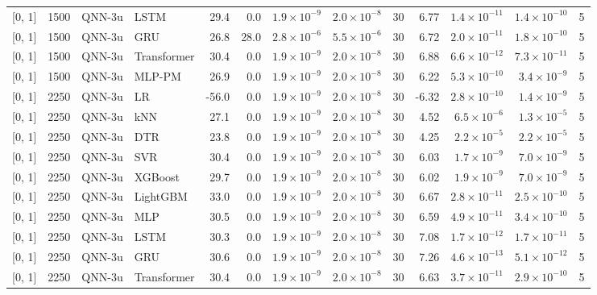 \begin{longtable}{lrllrrrrrrrrr}
{[0, 1]} & 1500 & QNN-3u & LSTM & 29.4 & 0.0 & $1.9 \times 10^{-9}$ & $2.0 \times 10^{-8}$ & 30 & 6.77 & $1.4 \times 10^{-11}$ & $1.4 \times 10^{-10}$ & 5 \\
{[0, 1]} & 1500 & QNN-3u & GRU & 26.8 & 28.0 & $2.8 \times 10^{-6}$ & $5.5 \times 10^{-6}$ & 30 & 6.72 & $2.0 \times 10^{-11}$ & $1.8 \times 10^{-10}$ & 5 \\
{[0, 1]} & 1500 & QNN-3u & Transformer & 30.4 & 0.0 & $1.9 \times 10^{-9}$ & $2.0 \times 10^{-8}$ & 30 & 6.88 & $6.6 \times 10^{-12}$ & $7.3 \times 10^{-11}$ & 5 \\
{[0, 1]} & 1500 & QNN-3u & MLP-PM & 26.9 & 0.0 & $1.9 \times 10^{-9}$ & $2.0 \times 10^{-8}$ & 30 & 6.22 & $5.3 \times 10^{-10}$ & $3.4 \times 10^{-9}$ & 5 \\
\midrule
{[0, 1]} & 2250 & QNN-3u & LR & -56.0 & 0.0 & $1.9 \times 10^{-9}$ & $2.0 \times 10^{-8}$ & 30 & -6.32 & $2.8 \times 10^{-10}$ & $1.4 \times 10^{-9}$ & 5 \\
{[0, 1]} & 2250 & QNN-3u & kNN & 27.1 & 0.0 & $1.9 \times 10^{-9}$ & $2.0 \times 10^{-8}$ & 30 & 4.52 & $6.5 \times 10^{-6}$ & $1.3 \times 10^{-5}$ & 5 \\
{[0, 1]} & 2250 & QNN-3u & DTR & 23.8 & 0.0 & $1.9 \times 10^{-9}$ & $2.0 \times 10^{-8}$ & 30 & 4.25 & $2.2 \times 10^{-5}$ & $2.2 \times 10^{-5}$ & 5 \\
{[0, 1]} & 2250 & QNN-3u & SVR & 30.4 & 0.0 & $1.9 \times 10^{-9}$ & $2.0 \times 10^{-8}$ & 30 & 6.03 & $1.7 \times 10^{-9}$ & $7.0 \times 10^{-9}$ & 5 \\
{[0, 1]} & 2250 & QNN-3u & XGBoost & 29.7 & 0.0 & $1.9 \times 10^{-9}$ & $2.0 \times 10^{-8}$ & 30 & 6.02 & $1.9 \times 10^{-9}$ & $7.0 \times 10^{-9}$ & 5 \\
{[0, 1]} & 2250 & QNN-3u & LightGBM & 33.0 & 0.0 & $1.9 \times 10^{-9}$ & $2.0 \times 10^{-8}$ & 30 & 6.67 & $2.8 \times 10^{-11}$ & $2.5 \times 10^{-10}$ & 5 \\
{[0, 1]} & 2250 & QNN-3u & MLP & 30.5 & 0.0 & $1.9 \times 10^{-9}$ & $2.0 \times 10^{-8}$ & 30 & 6.59 & $4.9 \times 10^{-11}$ & $3.4 \times 10^{-10}$ & 5 \\
{[0, 1]} & 2250 & QNN-3u & LSTM & 30.3 & 0.0 & $1.9 \times 10^{-9}$ & $2.0 \times 10^{-8}$ & 30 & 7.08 & $1.7 \times 10^{-12}$ & $1.7 \times 10^{-11}$ & 5 \\
{[0, 1]} & 2250 & QNN-3u & GRU & 30.6 & 0.0 & $1.9 \times 10^{-9}$ & $2.0 \times 10^{-8}$ & 30 & 7.26 & $4.6 \times 10^{-13}$ & $5.1 \times 10^{-12}$ & 5 \\
{[0, 1]} & 2250 & QNN-3u & Transformer & 30.4 & 0.0 & $1.9 \times 10^{-9}$ & $2.0 \times 10^{-8}$ & 30 & 6.63 & $3.7 \times 10^{-11}$ & $2.9 \times 10^{-10}$ & 5 \\

\end{longtable}
